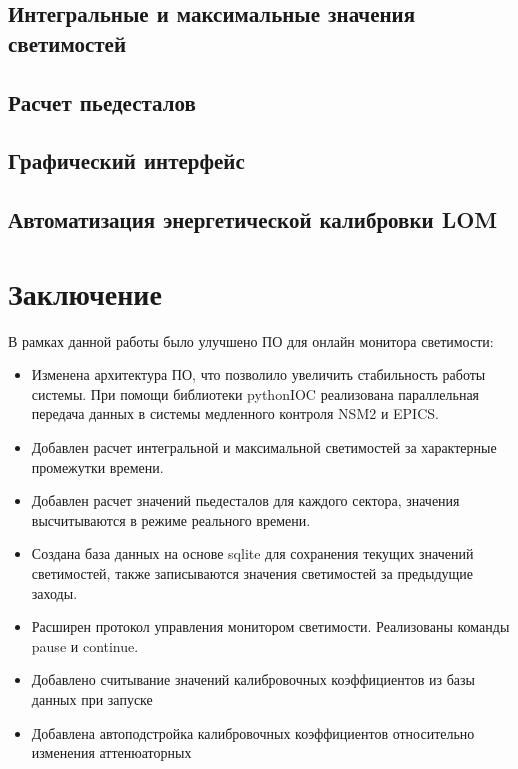 \documentclass[a4paper, 14pt]{extarticle}
\let\stdsection\section
\renewcommand\section{\newpage\stdsection}
\begin{document}
    \subsection{Интегральные и максимальные значения светимостей}
    
    \subsection{Расчет пьедесталов}
    
    \subsection{Графический интерфейс}
    
    \subsection{Автоматизация энергетической калибровки LOM}
    
\section*{Заключение}
    В рамках данной работы было улучшено ПО для онлайн монитора светимости:
    \begin{itemize}
        \item Изменена архитектура ПО, что позволило увеличить стабильность работы системы. При помощи библиотеки pythonIOC реализована параллельная передача данных в системы медленного контроля NSM2 и EPICS.
        \item Добавлен расчет интегральной и максимальной светимостей за характерные промежутки времени.
        \item Добавлен расчет значений пьедесталов для каждого сектора, значения высчитываются в режиме реального времени.
        \item Создана база данных на основе sqlite для сохранения текущих значений светимостей, также записываются значения светимостей за предыдущие заходы.
        \item Расширен протокол управления монитором светимости. Реализованы команды pause и continue.
        \item Добавлено считывание значений калибровочных коэффициентов из базы данных при запуске
        \item Добавлена автоподстройка калибровочных коэффициентов относительно изменения аттенюаторных
    \end{itemize}
    
\end{document}
